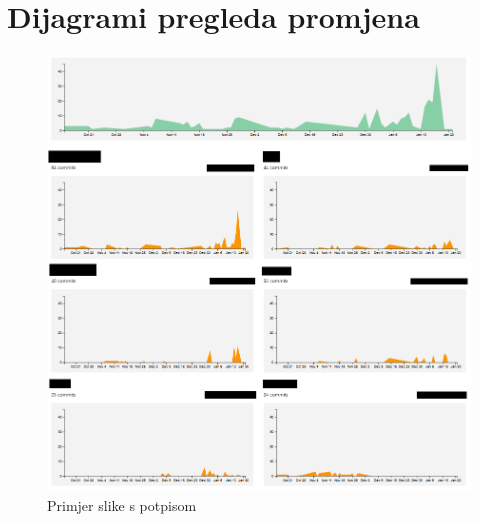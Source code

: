 					
		\eject
		\section*{Dijagrami pregleda promjena}
		
		
		\begin{figure}[H]
			\includegraphics[scale=0.4]{slike/aktivnost.PNG}
			\centering
			\caption{Primjer slike s potpisom}
			\label{fig:promjene}
		\end{figure}